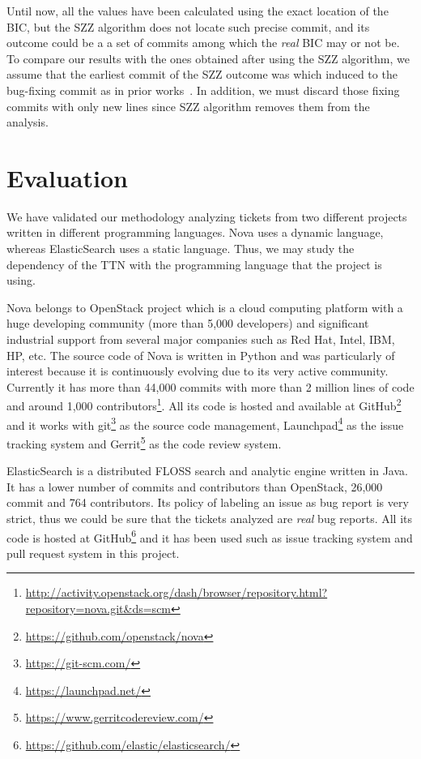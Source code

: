 \documentclass[10pt, conference]{IEEEtran}
\begin{document}
Until now, all the values have been calculated using the exact location of the BIC, but the SZZ algorithm does not locate such precise commit, and its outcome could be a a set of commits among which the \emph{real} BIC may or not be. To compare our results with the ones obtained after using the SZZ algorithm, we assume that the earliest commit of the SZZ outcome was which induced to the bug-fixing commit as in prior works~\cite{eyolfson2011time}. In addition, we must discard those fixing commits with only new lines since SZZ algorithm removes them from the analysis.

\section{Evaluation}
\label{sec:evaluation}

We have validated our methodology analyzing tickets from two different projects written in different programming languages. Nova uses a dynamic language, whereas ElasticSearch uses a static language. Thus, we may study the dependency of the TTN with the programming language that the project is using.

Nova belongs to OpenStack project which is a cloud computing platform with a huge developing community (more than 5,000 developers) and significant industrial support from several major companies such as Red Hat, Intel, IBM, HP, etc. The source code of Nova is written in Python and was particularly of interest because it is continuously evolving due to its very active community. Currently it has more than 44,000 commits with more than 2 million lines of code and around 1,000 contributors\footnote{\url{http://activity.openstack.org/dash/browser/repository.html?repository=nova.git&ds=scm}}. All its code is hosted and available at GitHub\footnote{\url{https://github.com/openstack/nova}} and it works with git\footnote{\url{https://git-scm.com/}} as the source code management, Launchpad\footnote{\url{https://launchpad.net/}} as the issue tracking system and Gerrit\footnote{\url{https://www.gerritcodereview.com/}} as the code review system.

ElasticSearch is a distributed FLOSS search and analytic engine written in Java. It has a lower number of commits and contributors than OpenStack, 26,000 commit and 764 contributors. Its policy of labeling an issue as bug report is very strict, thus we could be sure that the tickets analyzed are \emph{real} bug reports. All its code is hosted at GitHub\footnote{\url{https://github.com/elastic/elasticsearch/}} and it has been used such as issue tracking system and pull request system in this project.
\end{document}
